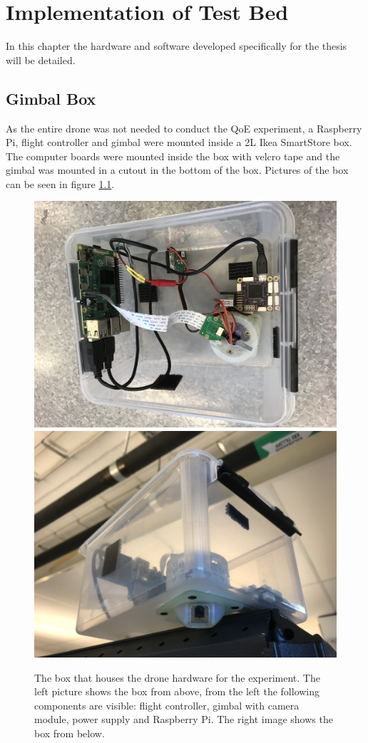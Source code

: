 \documentclass[nofilelist]{cslthse-msc}
\begin{document}
\chapter{Implementation of Test Bed}
In this chapter the hardware and software developed specifically for the thesis will be detailed.

\section{Gimbal Box}
As the entire drone was not needed to conduct the QoE experiment, a Raspberry Pi, flight controller and gimbal were mounted inside a 2L Ikea SmartStore box. The computer boards were mounted inside the box with velcro tape and the gimbal was mounted in a cutout in the bottom of the box. Pictures of the box can be seen in figure \ref{fig:drone-setup}.

\begin{figure}[htp]
   \centering
   \includegraphics[width=.47\textwidth]{images/drone-box-1.jpg}\hfill
   \includegraphics[width=.47\textwidth]{images/drone-box-2.jpg}
   \caption{The box that houses the drone hardware for the experiment. The left picture shows the box from above, from the left the following components are visible: flight controller, gimbal with camera module, power supply and Raspberry Pi. The right image shows the box from below.}
   \label{fig:drone-setup}
\end{figure}
\end{document}

